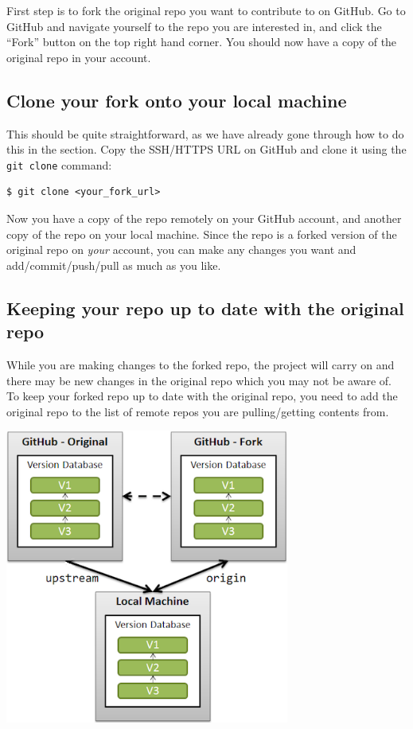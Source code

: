 \documentclass[a4paper, 12pt]{article}
\begin{document}
First step is to fork the original repo you want to contribute to on GitHub.
Go to GitHub and navigate yourself to the repo you are interested in, and click the ``Fork'' button on the top right hand corner.
You should now have a copy of the original repo in your account.

\subsection*{Clone your fork onto your local machine}

This should be quite straightforward, as we have already gone through how to do this in the {\itshape {}} section.
Copy the SSH/HTTPS URL on GitHub and clone it using the \verb|git clone| command:
\begin{lstlisting}
$ git clone <your_fork_url>
\end{lstlisting}

Now you have a copy of the repo remotely on your GitHub account, and another copy of the repo on your local machine.
Since the repo is a forked version of the original repo on {\itshape your} account, you can make any changes you want and add/commit/push/pull as much as you like.

\subsection*{Keeping your repo up to date with the original repo}

While you are making changes to the forked repo, the project will carry on and there may be new changes in the original repo  which you may not be aware of.
To keep your forked repo up to date with the original repo, you need to add the original repo to the list of remote repos you are pulling/getting contents from.

\begin{center}
\includegraphics[width=0.7\textwidth]{./images/fork}
\end{center}
\end{document}
